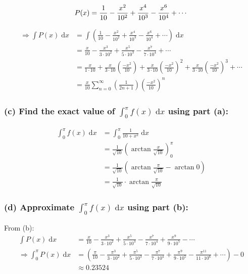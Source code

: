 \documentclass[12pt]{article}
\begin{document}
$$
P(x) = \frac{1}{10}
- \frac{x^2}{10^2}
+ \frac{x^4}{10^3}
- \frac{x^6}{10^4}
+ \cdots\\
$$

\begin{align*}
    \Longrightarrow
    \int P(x)\;\mathrm{d}x
    &= \int \left( \frac{1}{10}
    - \frac{x^2}{10^2}
    + \frac{x^4}{10^3}
    - \frac{x^6}{10^4}
    + \cdots \right) \;\mathrm{d}x\\
    &= \frac{x}{10}
    - \frac{x^3}{3\cdot 10^2}
    + \frac{x^5}{5\cdot 10^3}
    - \frac{x^7}{7\cdot 10^4}
    + \cdots\\
    &= \frac{x}{1\cdot 10}
    + \frac{x}{3\cdot 10} \left(\frac{-x^2}{10} \right)
    + \frac{x}{3\cdot 10} \left(\frac{-x^2}{10} \right)^2
    + \frac{x}{3\cdot 10} \left(\frac{-x^2}{10} \right)^3
    + \cdots\\
    &= \frac{x}{10} \sum_{n=0}^\infty \left(\frac{1}{2n+1}  \right) \left(\frac{-x^2}{10} \right)^n
\end{align*}






\subsubsection*{(c) Find the exact value of ${\displaystyle \int_0^{\pi} f(x) \;\mathrm{d}x}$ using part (a):}
\begin{align*}
    \int_0^{\pi} f(x) \;\mathrm{d}x &= \int_0^{\pi} \frac{1}{10+x^2} \;\mathrm{d}x\\
    &= \frac{1}{\sqrt{10}} \left( \arctan{\frac{x}{\sqrt{10}}} \right)_0^{\pi}\\
    &= \frac{1}{\sqrt{10}} \left( \arctan{\frac{\pi}{\sqrt{10}}}
    -\arctan{0}\right)\\
    &= \frac{1}{\sqrt{10}}\cdot \arctan{\frac{\pi}{\sqrt{10}}}
\end{align*}






\subsubsection*{(d) Approximate $\displaystyle \int_0^{\pi} f(x) \;\mathrm{d}x$ using part (b):}

\noindent From (b):
\begin{align*}
    \int P(x)\;\mathrm{d}x
    &= \frac{x}{10}
    - \frac{x^3}{3\cdot 10^2}
    + \frac{x^5}{5\cdot 10^3}
    - \frac{x^7}{7\cdot 10^4}
    + \frac{x^9}{9\cdot 10^5}
    - \cdots\\
    \Longrightarrow
    \int_0^{\pi} P(x) \;\mathrm{d}x
    &=\left( \frac{\pi}{10}
    - \frac{\pi^3}{3\cdot 10^2}
    + \frac{\pi^5}{5\cdot 10^3}
    - \frac{\pi^7}{7\cdot 10^4}
    + \frac{\pi^9}{9\cdot 10^5}
    - \frac{\pi^{11}}{11\cdot 10^6}
    + \cdots\right)-0\\
    & \approx 0.23524
\end{align*}
\end{document}
